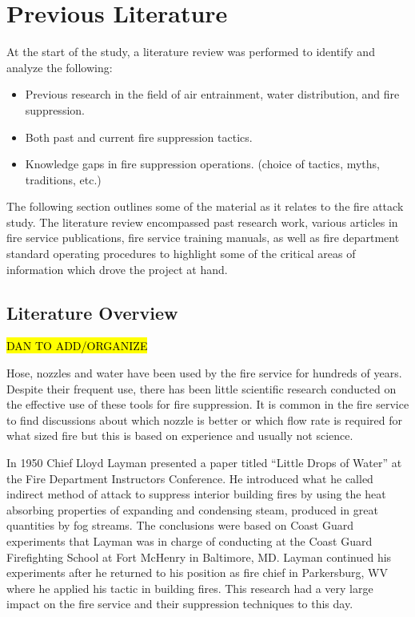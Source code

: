 \documentclass{article}
\begin{document}
\clearpage

\section{Previous Literature}

At the start of the study, a literature review was performed to identify and analyze the following:

\begin{itemize}
	\item Previous research in the field of air entrainment, water distribution, and fire suppression.
	\item Both past and current fire suppression tactics.
	\item Knowledge gaps in fire suppression operations. (choice of tactics, myths, traditions, etc.) 
\end{itemize}

The following section outlines some of the material as it relates to the fire attack study. The literature review encompassed past research work, various articles in fire service publications, fire service training manuals, as well as fire department standard operating procedures to highlight some of the critical areas of information which drove the project at hand.

\subsection{Literature Overview}

\hl{DAN TO ADD/ORGANIZE}

Hose, nozzles and water have been used by the fire service for hundreds of years. Despite their frequent use, there has been little scientific research conducted on the effective use of these tools for fire suppression. It is common in the fire service to find discussions about which nozzle is better or which flow rate is required for what sized fire but this is based on experience and usually not science. 

In 1950 Chief Lloyd Layman presented a paper titled “Little Drops of Water” at the Fire Department Instructors Conference. He introduced what he called indirect method of attack to suppress interior building fires by using the heat absorbing properties of expanding and condensing steam, produced in great quantities by fog streams. The conclusions were based on Coast Guard experiments that Layman was in charge of conducting at the Coast Guard Firefighting School at Fort McHenry in Baltimore, MD. Layman continued his experiments after he returned to his position as fire chief in Parkersburg, WV where he applied his tactic in building fires.  This research had a very large impact on the fire service and their suppression techniques to this day. 
\end{document}

